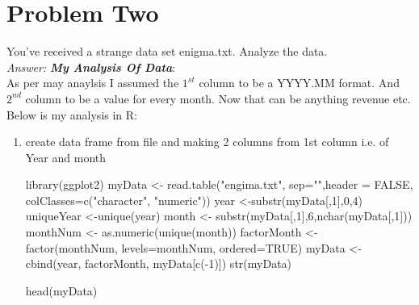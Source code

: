 \documentclass{article}
\begin{document}
\section*{Problem Two} You've received a strange data set enigma.txt. Analyze the data.\\
	\emph{Answer:} \emph{\textbf{My Analysis Of Data}}: \\
	As per may anaylsis I assumed the $1^{st}$ column to be a YYYY.MM format. And $2^{nd}$ column to be a value for every month. Now that can be anything revenue etc. Below is my analysis in R:
\begin{enumerate}
\item create data frame from file and making 2 columns from 1st column i.e. of Year and month
\begin{Schunk}
\begin{Sinput}
library(ggplot2)
myData <- read.table("engima.txt", sep="",header = FALSE, colClasses=c("character", "numeric"))
year <-substr(myData[,1],0,4)
uniqueYear <-unique(year)
month <- substr(myData[,1],6,nchar(myData[,1]))
monthNum <- as.numeric(unique(month))
factorMonth <- factor(monthNum, levels=monthNum, ordered=TRUE)
myData <- cbind(year, factorMonth, myData[c(-1)])
str(myData)
\end{Sinput}
\begin{Soutput}
head(myData) 


\end{Soutput}
\end{Schunk}
\end{enumerate}
\end{document}
